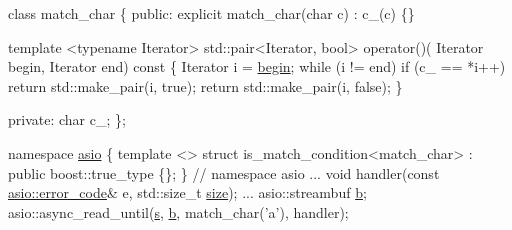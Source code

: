 \begin{DoxyCode}
 \textcolor{keyword}{class }match\_char
\{
\textcolor{keyword}{public}:
  \textcolor{keyword}{explicit} match\_char(\textcolor{keywordtype}{char} c) : c\_(c) \{\}

  \textcolor{keyword}{template} <\textcolor{keyword}{typename} Iterator>
  std::pair<Iterator, bool> operator()(
      Iterator begin, Iterator end)\textcolor{keyword}{ const}
\textcolor{keyword}{  }\{
    Iterator i = \hyperlink{group__async__connect_ga7055bca9225050c030c19c7dc926fa53}{begin};
    \textcolor{keywordflow}{while} (i != end)
      \textcolor{keywordflow}{if} (c\_ == *i++)
        \textcolor{keywordflow}{return} std::make\_pair(i, \textcolor{keyword}{true});
    \textcolor{keywordflow}{return} std::make\_pair(i, \textcolor{keyword}{false});
  \}

\textcolor{keyword}{private}:
  \textcolor{keywordtype}{char} c\_;
\};

\textcolor{keyword}{namespace }\hyperlink{namespaceasio}{asio} \{
  \textcolor{keyword}{template} <> \textcolor{keyword}{struct }is\_match\_condition<match\_char>
    : \textcolor{keyword}{public} boost::true\_type \{\};
\} \textcolor{comment}{// namespace asio}
...
void handler(\textcolor{keyword}{const} \hyperlink{classasio_1_1error__code}{asio::error\_code}& e, std::size\_t \hyperlink{namespaceuva_1_1utils_1_1containers_aea6a0a858974dd7edb4227dcbcbc1eb6a0be5bdf7cf8c7c58d0bc5678caa07791}{size});
...
asio::streambuf \hyperlink{group__async__read_ga945a5c18fa77a9e2eba420f8f44b2a4f}{b};
asio::async\_read\_until(\hyperlink{group__async__connect_ga31ab74b9ea6c77932dddd016cfc7920a}{s}, \hyperlink{group__async__read_ga945a5c18fa77a9e2eba420f8f44b2a4f}{b}, match\_char(\textcolor{charliteral}{'a'}), handler);
\end{DoxyCode}
 \hypertarget{group__async__read_ga3d4f5c52cc8c1c5d16fc7bf7e0f75c4b}{}
